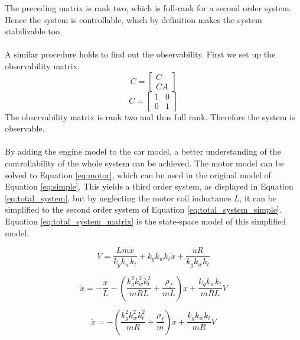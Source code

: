 \documentclass[final]{scrreprt} %
\begin{document}
The preceding matrix is rank two, which is full-rank for a second order system.
Hence the system is controllable, which by definition makes the system stabilizable too.
\\\\
A similar procedure holds to find out the observability.
First we set up the observability matrix:
\begin{equation}
C =
\begin{bmatrix}
C\\
CA
\end{bmatrix}
\end{equation}
\begin{equation}
C =
\begin{bmatrix}
1 & 0\\
0 & 1
\end{bmatrix}\label{eq:observability}
\end{equation}
The observability matrix is rank two and thus full rank.
Therefore the system is observable.
\\\\
By adding the engine model to the car model, a better understanding of the controllability of the whole system can be achieved.
The motor model can be solved to Equation \ref{eq:motor}, which can be used in the original model of Equation \ref{eq:simple}.
This yields a third order system, as displayed in Equation \ref{eq:total_system}, but by neglecting the motor coil inductance $L$, it can be simplified to the second order system of Equation \ref{eq:total_system_simple}.
Equation \ref{eq:total_system_matrix} is the state-space model of this simplified model.

\begin{equation}
	V = \frac{Lm\ddot{x}}{k_g k_w k_t} + k_g k_w k_t \dot{x} + \frac{uR}{k_g k_w k_t}
	\label{eq:motor}
\end{equation}

\begin{equation}
	\dddot{x} = -\frac{\ddot{x}}{L} -(\frac{k_g^2 k_w^2 k_t^2}{mRL} + \frac{\rho_f}{mL})\dot{x} + \frac{k_g k_w k_t}{mRL}V
	\label{eq:total_system}
\end{equation}

\begin{equation}
	\ddot{x} = -(\frac{k_g^2 k_w^2 k_t^2}{mR} + \frac{\rho_f}{m})\dot{x} + \frac{k_g k_w k_t}{mR}V
	\label{eq:total_system_simple}
\end{equation}
\end{document}
